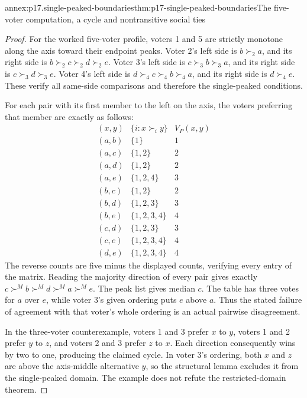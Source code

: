 \begin{annexitem}{annex:p17.single-peaked-boundaries}{thm:p17-single-peaked-boundaries}{The five-voter computation, a cycle and nontransitive social ties}
\begin{proof}
For the worked five-voter profile, voters 1 and 5 are strictly monotone
along the axis toward their endpoint peaks. Voter 2's left side is
\(b\succ_2 a\), and its right side is
\(b\succ_2 c\succ_2 d\succ_2 e\). Voter 3's left side is
\(c\succ_3 b\succ_3 a\), and its right side is
\(c\succ_3 d\succ_3 e\). Voter 4's left side is
\(d\succ_4 c\succ_4 b\succ_4 a\), and its right side is
\(d\succ_4 e\). These verify all same-side comparisons and
therefore the single-peaked conditions.

For each pair with its first member to the left on the axis, the
voters preferring that member are exactly as follows:
\[
 \begin{array}{c|c|c}
 (x,y)&\{i:x\succ_i y\}&V_P(x,y)\\\hline
 (a,b)&\{1\}&1\\
 (a,c)&\{1,2\}&2\\
 (a,d)&\{1,2\}&2\\
 (a,e)&\{1,2,4\}&3\\
 (b,c)&\{1,2\}&2\\
 (b,d)&\{1,2,3\}&3\\
 (b,e)&\{1,2,3,4\}&4\\
 (c,d)&\{1,2,3\}&3\\
 (c,e)&\{1,2,3,4\}&4\\
 (d,e)&\{1,2,3,4\}&4
 \end{array}
\]
The reverse counts are five minus the displayed counts, verifying
every entry of the matrix. Reading the majority direction of every
pair gives exactly \(c\succ^M b\succ^M d\succ^M a\succ^M e\).
The peak list gives median \(c\). The table has three votes for
\(a\) over \(e\), while voter 3's given ordering puts \(e\)
above \(a\). Thus the stated failure of agreement with that voter's
whole ordering is an actual pairwise disagreement.

In the three-voter counterexample, voters 1 and 3 prefer \(x\) to
\(y\), voters 1 and 2 prefer \(y\) to \(z\), and voters 2
and 3 prefer \(z\) to \(x\). Each direction consequently wins
by two to one, producing the claimed cycle. In voter 3's ordering,
both \(x\) and \(z\) are above the axis-middle alternative
\(y\), so the structural lemma excludes it from the single-peaked
domain. The example does not refute the restricted-domain theorem.


\end{proof}
\end{annexitem}
